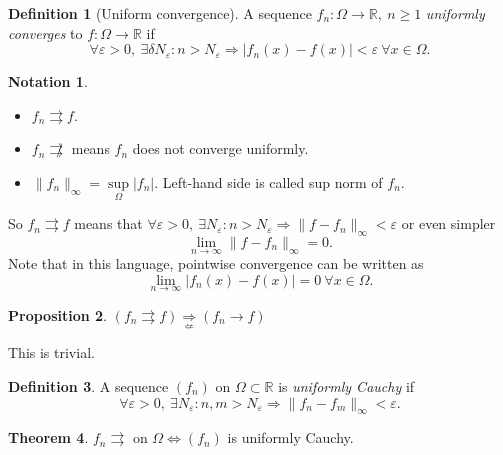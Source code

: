 \documentclass[a4paper]{article}
\theoremstyle{definition}
\newtheorem{defn}{Definition}[subsection]
\newtheorem{prop}[defn]{Proposition}
\newtheorem{thm}[defn]{Theorem}
\newtheorem*{notation}{Notation}
\begin{document}
\begin{defn}[Uniform convergence]
A sequence $f_n:\Omega \rightarrow \mathbb R,\ n\geq 1$ \textit{uniformly converges} to $f:\Omega \rightarrow \mathbb R$ if
\[
\forall \varepsilon >0,\ \exists \delta N_\varepsilon : n>N_\varepsilon \Rightarrow |f_n(x)-f(x)|<\varepsilon \ \forall x\in \Omega.
\]
\end{defn}
\begin{notation}
\begin{itemize}
    \item $f_n \rightrightarrows f$.
    \item $f_n \not\rightrightarrows$ means $f_n$ does not converge uniformly.
    \item $\|f_n\|_{\infty} = \underset{\Omega}{\sup} |f_n|$. Left-hand side is called sup norm of $f_n$.
\end{itemize}
\end{notation}
So $f_n \rightrightarrows f$ means that $\forall \varepsilon >0,\ \exists N_\varepsilon : n>N_\varepsilon \Rightarrow \|f-f_n\|_{\infty}<\varepsilon$ or even simpler
\[
\lim_{n \rightarrow \infty} \|f-f_n\|_{\infty} =0 .
\]
Note that in this language, pointwise convergence can be written as
\[
\lim_{n\rightarrow \infty} |f_n(x)-f(x)|=0 \ \forall x\in \Omega .
\]
\begin{prop}
$(f_n \rightrightarrows f) \underset{\not\Leftarrow}{\Rightarrow} (f_n\rightarrow f)$
\end{prop}
This is trivial.
\begin{defn}
A sequence $(f_n)$ on $\Omega \subset \mathbb R$ is \textit{uniformly Cauchy} if
\[
\forall \varepsilon >0,\ \exists N_\varepsilon : n,m>N_\varepsilon \Rightarrow \|f_n-f_m\|_\infty < \varepsilon .
\]
\end{defn}
\begin{thm}
$f_n \rightrightarrows$ on $\Omega \Leftrightarrow (f_n)$ is uniformly Cauchy.
\end{thm}
\end{document}
